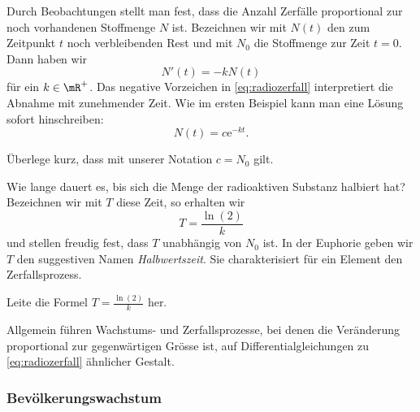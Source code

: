 \documentclass[%
draft,
11pt,%
twoside,%
titlepage,%
german,%
headsepline%
]{scrartcl}
\begin{document}
Durch
Beobachtungen stellt man fest, dass die Anzahl Zerf\"alle proportional zur noch vorhandenen Stoffmenge $N$ ist. Bezeichnen wir mit $N(t)$ den zum Zeitpunkt $t$ noch verbleibenden Rest und mit $N_0$ die Stoffmenge zur Zeit $t=0$. Dann haben wir
\begin{equation}\label{eq:radiozerfall}
N'(t)=-kN(t)
\end{equation}
f\"ur ein $k\in\mR^+$. Das negative Vorzeichen in \eqref{eq:radiozerfall} interpretiert die Abnahme mit zunehmender Zeit. Wie im ersten Beispiel kann man eine L\"osung sofort hinschreiben:
$$N(t)=c\mathrm{e}^{-kt}.$$

\begin{ueb}
\"Uberlege kurz, dass mit unserer Notation $c=N_0$ gilt.
\end{ueb}

Wie lange dauert es, bis sich die Menge der radioaktiven Substanz halbiert hat? Bezeichnen wir mit $T$ diese Zeit, so erhalten wir
$$T=\frac{\ln(2)}{k}$$
und stellen freudig fest, dass $T$ unabh\"angig von $N_0$ ist. In der Euphorie geben wir $T$ den suggestiven Namen \emph{Halbwertszeit}. Sie charakterisiert f\"ur ein Element den Zerfallsprozess.

\begin{ueb}
Leite die Formel $T=\frac{\ln(2)}{k}$ her.
\end{ueb}

\begin{bem}
Allgemein f\"uhren Wachstums- und Zerfallsprozesse, bei denen die Ver\"anderung proportional zur gegenw\"artigen Gr\"osse ist, auf Differentialgleichungen zu \eqref{eq:radiozerfall} \"ahnlicher Gestalt.
\end{bem}

\subsubsection{Bev\"olkerungswachstum}
\end{document}
